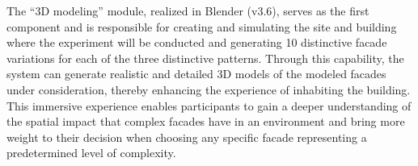 %    

The ``3D modeling'' module, realized in Blender (v3.6), serves as the first component and is responsible for creating and simulating the site and building where the experiment will be conducted and generating 10 distinctive facade variations for each of the three distinctive patterns.
Through this capability, the system can generate realistic and detailed 3D models of the modeled facades under consideration, thereby enhancing the experience of inhabiting the building.
This immersive experience enables participants to gain a deeper understanding of the spatial impact that complex facades have in an environment and bring more weight to their decision when choosing any specific facade representing a predetermined level of complexity.

